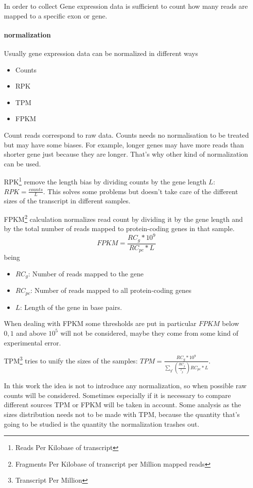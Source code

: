 In order to collect Gene expression data is sufficient to count how many reads are mapped to a specific exon or gene.

\paragraph{normalization}
Usually gene expression data can be normalized in different ways
\begin{itemize}
	\item Counts
	\item RPK
	\item TPM
	\item FPKM
\end{itemize}
Count reads correspond to raw data. Counts needs no normalisation to be treated but may have some biases. For example, longer genes may have more reads than shorter gene just because they are longer. That's why other kind of normalization can be used.

RPK\footnote{Reads Per Kilobase of transcript} remove the length bias by dividing counts by the gene length $L$: \(RPK=\frac{counts}{L}\). This solves some problems but doesn't take care of the different sizes of the transcript in different samples.

FPKM\footnote{Fragments Per Kilobase of transcript per Million mapped reads} calculation normalizes read count by dividing it by the gene length and by the total number of reads mapped to protein-coding genes in that sample.
\[
FPKM = \frac{RC_g*10^9}{RC_{pc}*L}
\]
being
\begin{itemize}
	\item $RC_g$: Number of reads mapped to the gene
	\item $RC_{pc}$: Number of reads mapped to all protein-coding genes
	\item $L$: Length of the gene in base pairs.
\end{itemize}
When dealing with FPKM some thresholds are put in particular $FPKM$ below $0,1$ and above $10^5$ will not be considered, maybe they come from some kind of experimental error.

TPM\footnote{Transcript Per Million} tries to unify the sizes of the samples: $TPM = \frac{RC_g*10^9}{\sum_{g\prime} \left(\frac{RC_{g^\prime}}{l_{g^\prime}}\right) RC_{pc}*L}$.

In this work the idea is not to introduce any normalization, so when possible raw counts will be considered. Sometimes especially if it is necessary to compare different sources TPM or FPKM will be taken in account. Some analysis as the sizes distribution needs not to be made with TPM, because the quantity that's going to be studied is the quantity the normalization trashes out.

